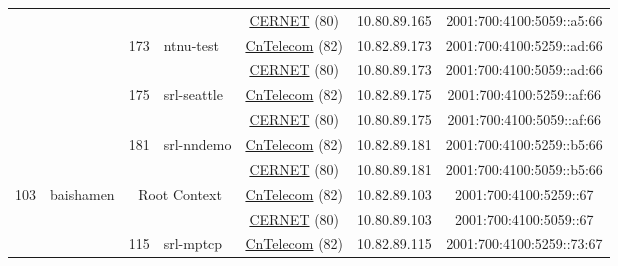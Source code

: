 \begin{small}
\begin{center}
\begin{longtable}{|c|c|c|c|c|c|c|c|}
  &  &  &  & \multicolumn{2}{|c|}{\tiny{\href{http://www.cernet.edu.cn}{CERNET} (80)}} & \tiny{10.80.89.165} & \tiny{2001:700:4100:5059::a5:66} \\* \cline{3-3}\cline{4-4}\cline{5-5}\cline{6-6}\cline{7-7}\cline{8-8}
  &  & \multirow{2}{*}{\tiny{173}} & \multicolumn{1}{|l|}{\multirow{2}{*}{\tiny{ntnu-test}}} & \multicolumn{2}{|c|}{\tiny{\href{http://www.chinatelecom.com.cn}{CnTelecom} (82)}} & \tiny{10.82.89.173} & \tiny{2001:700:4100:5259::ad:66} \\* \cline{5-5}\cline{6-6}\cline{7-7}\cline{8-8}
  &  &  &  & \multicolumn{2}{|c|}{\tiny{\href{http://www.cernet.edu.cn}{CERNET} (80)}} & \tiny{10.80.89.173} & \tiny{2001:700:4100:5059::ad:66} \\* \cline{3-3}\cline{4-4}\cline{5-5}\cline{6-6}\cline{7-7}\cline{8-8}
  &  & \multirow{2}{*}{\tiny{175}} & \multicolumn{1}{|l|}{\multirow{2}{*}{\tiny{srl-seattle}}} & \multicolumn{2}{|c|}{\tiny{\href{http://www.chinatelecom.com.cn}{CnTelecom} (82)}} & \tiny{10.82.89.175} & \tiny{2001:700:4100:5259::af:66} \\* \cline{5-5}\cline{6-6}\cline{7-7}\cline{8-8}
  &  &  &  & \multicolumn{2}{|c|}{\tiny{\href{http://www.cernet.edu.cn}{CERNET} (80)}} & \tiny{10.80.89.175} & \tiny{2001:700:4100:5059::af:66} \\* \cline{3-3}\cline{4-4}\cline{5-5}\cline{6-6}\cline{7-7}\cline{8-8}
  &  & \multirow{2}{*}{\tiny{181}} & \multicolumn{1}{|l|}{\multirow{2}{*}{\tiny{srl-nndemo}}} & \multicolumn{2}{|c|}{\tiny{\href{http://www.chinatelecom.com.cn}{CnTelecom} (82)}} & \tiny{10.82.89.181} & \tiny{2001:700:4100:5259::b5:66} \\* \cline{5-5}\cline{6-6}\cline{7-7}\cline{8-8}
  &  &  &  & \multicolumn{2}{|c|}{\tiny{\href{http://www.cernet.edu.cn}{CERNET} (80)}} & \tiny{10.80.89.181} & \tiny{2001:700:4100:5059::b5:66} \\ \hline
 \multirow{40}{*}{\tiny{103}} & \multicolumn{1}{|l|}{\multirow{40}{*}{\tiny{baishamen}}} & \multicolumn{2}{|c|}{\multirow{2}{*}{\tiny{Root Context}}} & \multicolumn{2}{|c|}{\tiny{\href{http://www.chinatelecom.com.cn}{CnTelecom} (82)}} & \tiny{10.82.89.103} & \tiny{2001:700:4100:5259::67} \\* \cline{5-5}\cline{6-6}\cline{7-7}\cline{8-8}
  &  & \multicolumn{2}{|c|}{} & \multicolumn{2}{|c|}{\tiny{\href{http://www.cernet.edu.cn}{CERNET} (80)}} & \tiny{10.80.89.103} & \tiny{2001:700:4100:5059::67} \\* \cline{3-3}\cline{4-4}\cline{5-5}\cline{6-6}\cline{7-7}\cline{8-8}
  &  & \multirow{2}{*}{\tiny{115}} & \multicolumn{1}{|l|}{\multirow{2}{*}{\tiny{srl-mptcp}}} & \multicolumn{2}{|c|}{\tiny{\href{http://www.chinatelecom.com.cn}{CnTelecom} (82)}} & \tiny{10.82.89.115} & \tiny{2001:700:4100:5259::73:67} \\* \cline{5-5}\cline{6-6}\cline{7-7}\cline{8-8}

\end{longtable}
\end{center}
\end{small}
